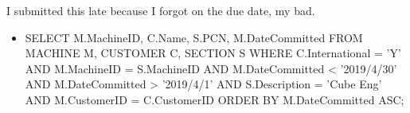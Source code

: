 \documentclass[12pt]{article}
\begin{document}
    I submitted this late because I forgot on the due date, my bad.

    \begin{itemize}
        \item SELECT M.MachineID, C.Name, S.PCN, M.DateCommitted
        FROM MACHINE M, CUSTOMER C, SECTION S
        WHERE C.International = 'Y' AND
            M.MachineID = S.MachineID AND
            M.DateCommitted < '2019/4/30' AND
            M.DateCommitted > '2019/4/1' AND
            S.Description = 'Cube Eng' AND
            M.CustomerID = C.CustomerID
        ORDER BY M.DateCommitted ASC;
    \end{itemize}
\end{document}
